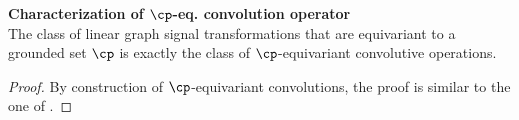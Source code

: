 \begin{claim}\textbf{Characterization of $\cp$-eq. convolution operator}\\
The class of linear graph signal transformations that are equivariant to a grounded set $\cp$ is exactly the class of $\cp$-equivariant convolutive operations.
\end{claim}

\begin{proof}
By construction of $\cp$-equivariant convolutions, the proof is similar to the one of .
\end{proof}


